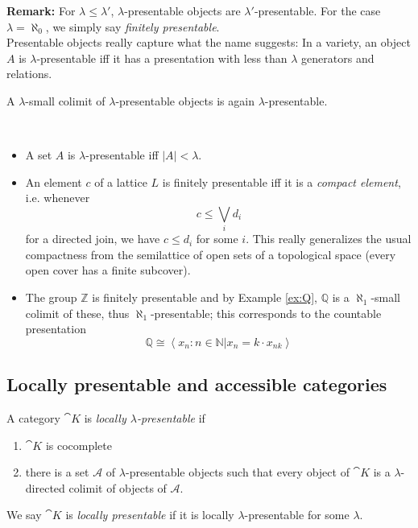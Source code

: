 \textbf{Remark: } For $\lambda \leq \lambda'$, $\lambda$-presentable objects are $\lambda'$-presentable. For the case $\lambda=\aleph_0$, we simply say \emph{finitely presentable}. \\

Presentable objects really capture what the name suggests: In a variety, an object $A$ is $\lambda$-presentable iff it has a presentation with less than $\lambda$ generators and relations.

\begin{Proposition}A $\lambda$-small colimit of $\lambda$-presentable objects is again $\lambda$-presentable.
\end{Proposition}

\begin{Example}\ \\
\begin{itemize}
\item A set $A$ is $\lambda$-presentable iff $|A| < \lambda$.
\item An element $c$ of a lattice $L$ is finitely presentable iff it is a \emph{compact element}, i.e. whenever
\[ c \leq \bigvee_i d_i \]
for a directed join, we have $c \leq d_i$ for some $i$. This really generalizes the usual compactness from the semilattice of open sets of a topological space (every open cover has a finite subcover).
\item The group $\mathbb Z$ is finitely presentable and by Example \ref{ex:Q}, $\mathbb Q$ is a $\aleph_1$-small colimit of these, thus $\aleph_1$-presentable; this corresponds to the countable presentation
\[ \mathbb Q \cong \left\langle x_n : n \in \mathbb N | x_n = k \cdot x_{nk} \right \rangle\]
\end{itemize}
\end{Example}

\subsection{Locally presentable and accessible categories}

\begin{Definition}
A category $\cat K$ is \emph{locally $\lambda$-presentable} if
\begin{enumerate}
\item $\cat K$ is cocomplete
\item there is a set $\mathcal A$ of $\lambda$-presentable objects such that every object of $\cat K$ is a $\lambda$-directed colimit of objects of $\mathcal A$.
\end{enumerate}
We say $\cat K$ is \emph{locally presentable} if it is locally $\lambda$-presentable for some $\lambda$.
\end{Definition}

